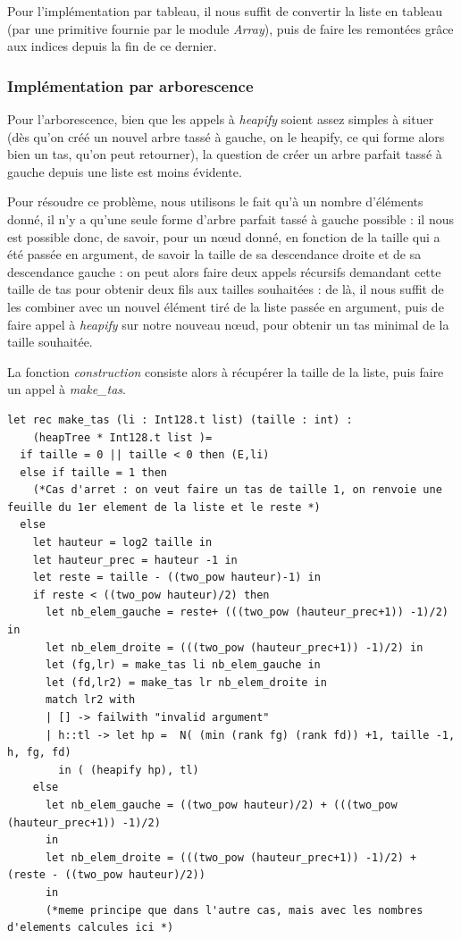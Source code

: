 \documentclass[12pt,a4paper]{article}
\begin{document}
Pour l'implémentation par tableau, il nous suffit de convertir la liste en tableau (par une primitive fournie par le module \textit{Array}), puis de faire les remontées grâce aux indices depuis la fin de ce dernier.

\subsubsection{Implémentation par arborescence}

Pour l'arborescence, bien que les appels à \textit{heapify} soient assez simples à situer (dès qu'on créé un nouvel arbre tassé à gauche, on le heapify, ce qui forme alors bien un tas, qu'on peut retourner), la question de créer un arbre parfait tassé à gauche depuis une liste est moins évidente.

Pour résoudre ce problème, nous utilisons le fait qu'à un nombre d'éléments donné, il n'y a qu'une seule forme d'arbre parfait tassé à gauche possible : il nous est possible donc, de savoir, pour un nœud donné, en fonction de la taille qui a été passée en argument, de savoir la taille de sa descendance droite et de sa descendance gauche : on peut alors faire deux appels récursifs demandant cette taille de tas pour obtenir deux fils aux tailles souhaitées : de là, il nous suffit de les combiner avec un nouvel élément tiré de la liste passée en argument, puis de faire appel à \textit{heapify} sur notre nouveau nœud, pour obtenir un tas minimal de la taille souhaitée.

La fonction \textit{construction} consiste alors à récupérer la taille de la liste, puis faire un appel à \textit{make\_tas}.

\bigskip \begin{lstlisting}
let rec make_tas (li : Int128.t list) (taille : int) :  
	(heapTree * Int128.t list )= 
  if taille = 0 || taille < 0 then (E,li)
  else if taille = 1 then
    (*Cas d'arret : on veut faire un tas de taille 1, on renvoie une feuille du 1er element de la liste et le reste *)
  else
    let hauteur = log2 taille in
    let hauteur_prec = hauteur -1 in
    let reste = taille - ((two_pow hauteur)-1) in 
    if reste < ((two_pow hauteur)/2) then
      let nb_elem_gauche = reste+ (((two_pow (hauteur_prec+1)) -1)/2) in
      let nb_elem_droite = (((two_pow (hauteur_prec+1)) -1)/2) in
      let (fg,lr) = make_tas li nb_elem_gauche in
      let (fd,lr2) = make_tas lr nb_elem_droite in
      match lr2 with 
      | [] -> failwith "invalid argument"
      | h::tl -> let hp =  N( (min (rank fg) (rank fd)) +1, taille -1, h, fg, fd) 
      	in ( (heapify hp), tl)  
    else
      let nb_elem_gauche = ((two_pow hauteur)/2) + (((two_pow (hauteur_prec+1)) -1)/2) 
      in
      let nb_elem_droite = (((two_pow (hauteur_prec+1)) -1)/2) + (reste - ((two_pow hauteur)/2))
      in
      (*meme principe que dans l'autre cas, mais avec les nombres d'elements calcules ici *)

\end{lstlisting} \bigskip
\end{document}
